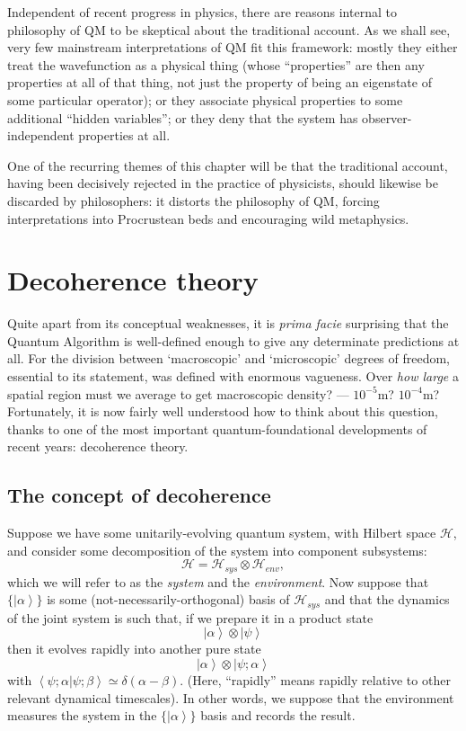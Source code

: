 \documentclass[12pt]{article}
\newcommand{\be}{\begin{equation}}
\newcommand{\ee}{\end{equation}}
\newcommand{\mc}[1]{\ensuremath{\mathcal{#1}}}
\newcommand{\ket}[1]{\ensuremath{\left|  #1 \right\rangle}}
\newcommand{\bk}[2]{\ensuremath{\left\langle #1 | #2 \right\rangle}}
\newcommand{\tpk}[2]{\ensuremath{\ket{#1}\!\otimes\!\ket{#2}}}
\begin{document}
Independent of recent progress in physics, there are reasons internal to philosophy of QM to be skeptical about the traditional account. As we shall see, very few mainstream interpretations of QM fit this framework: mostly they either treat the wavefunction as a physical thing (whose ``properties'' are then any properties at all of that thing, not just the property of being an eigenstate of some particular operator); or they associate physical properties to some additional ``hidden variables''; or they deny that the system has observer-independent properties at all.

One of the recurring themes of this chapter will be that the traditional account, having been decisively rejected in the practice of physicists, should likewise be discarded by philosophers: it distorts the philosophy of QM, forcing interpretations into Procrustean beds and encouraging wild metaphysics.

\section{Decoherence theory}\label{DMWWdecoherence}

Quite apart from its conceptual weaknesses, it is \emph{prima facie} surprising that the Quantum Algorithm is well-defined enough to give any determinate predictions at all. For the division between `macroscopic' and `microscopic' degrees of freedom, essential to its statement, was defined with enormous vagueness. Over \emph{how large} a spatial region must we average to get macroscopic density? --- $10^{-5} \mathrm{m}$? $10^{-4} \mathrm{m}$? Fortunately, it is now fairly well understood how to think about this question, thanks to one of the most important quantum-foundational developments of recent years: decoherence theory. 

\subsection{The concept of decoherence}\label{DMWWdecoherencegeneral}

Suppose we have some unitarily-evolving quantum system, with Hilbert space \mc{H}, and consider some decomposition of the system into component subsystems:
\be \mc{H}=\mc{H}_{sys}\otimes \mc{H}_{env},\ee
which we will refer to as the \emph{system} and the \emph{environment}.
Now suppose that $\{\ket{\alpha}\}$ is some (not-necessarily-orthogonal) basis of $\mc{H}_{sys}$ and that the dynamics of the joint system is such that, if we prepare it in a product state
\be
\tpk{\alpha}{\psi}
\ee
then it evolves rapidly into another pure state
\be
\tpk{\alpha}{\psi;\alpha}
\ee
with $\bk{\psi;\alpha}{\psi;\beta}\simeq \delta(\alpha-\beta)$. (Here, ``rapidly'' means rapidly relative to other relevant dynamical timescales). In other words, we suppose that the environment measures the system in the $\{\ket{\alpha}\}$ basis and records the result.
\end{document}
